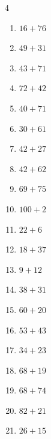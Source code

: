 \begin{multicols}{4}
\begin{enumerate}
  \item $16+76$
        \phantom{$=92$}

  \item $49+31$
        \phantom{$=80$}

  \item $43+71$
        \phantom{$=114$}

  \item $72+42$
        \phantom{$=114$}

  \item $40+71$
        \phantom{$=111$}

  \item $30+61$
        \phantom{$=91$}

  \item $42+27$
        \phantom{$=69$}

  \item $42+62$
        \phantom{$=104$}

  \item $69+75$
        \phantom{$=144$}

  \item $100+2$
        \phantom{$=102$}

  \item $22+6$
        \phantom{$=28$}

  \item $18+37$
        \phantom{$=55$}

  \item $9+12$
        \phantom{$=21$}

\columnbreak %

  \item $38+31$
        \phantom{$=69$}

  \item $60+20$
        \phantom{$=80$}

  \item $53+43$
        \phantom{$=96$}

  \item $34+23$
        \phantom{$=57$}

  \item $68+19$
        \phantom{$=87$}

  \item $68+74$
        \phantom{$=142$}

  \item $82+21$
        \phantom{$=103$}

  \item $26+15$
        \phantom{$=41$}


\end{enumerate}
\end{multicols}
